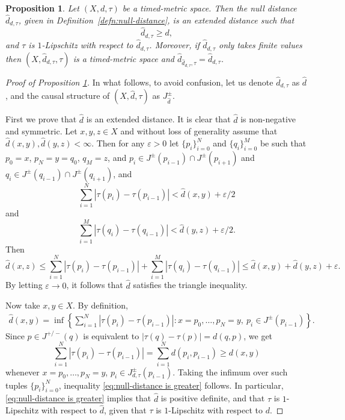 \documentclass[10pt,a4paper]{amsart}
\newtheorem{prop}{Proposition}
\newcommand{\be}{\begin{equation}}
\newcommand{\ee}{\end{equation}}
\begin{document}
\begin{prop}\label{prop-null-distance is greater}
Let $(X,d,\tau)$ be a timed-metric space. 
Then the null distance $\hat{d}_{d,\tau}$, given in Definition~\ref{defn:null-distance}, is an extended distance such that
\begin{equation}\label{eq:null-distance is greater}
\hat{d}_{d,\tau}\geq d,
\end{equation}
and $\tau$ is $1$-Lipschitz with respect to $\hat{d}_{d,\tau}$.
Moreover, if $\hat{d}_{d,\tau}$ only takes finite values then $(X,\hat{d}_{d,\tau},\tau)$ is a timed-metric space and $\hat{d}_{\hat{d}_{d,\tau},\tau} = \hat{d}_{d,\tau}$.
\end{prop}

\begin{proof}[Proof of Proposition \ref{prop-null-distance is greater}]

In what follows, to avoid confusion, let us denote  $\hat{d}_{d,\tau}$ as $\hat{d}$, and the causal structure of $(X,\hat d,\tau)$ as $J^\pm_{\hat d}$. 

First we prove that $\hat{d}$ is an extended distance. It is clear that $\hat{d}$ is non-negative and symmetric. Let $x,y,z\in X$ and without loss of generality assume that 
$\hat{d}(x,y), \hat{d}(y,z)< \infty$.
Then for any $\varepsilon>0$ let $\{p_i\}_{i=0}^{N}$ and $\{q_i\}_{i=0}^{M}$ be such that $p_0=x$, $p_N = y = q_0$, $q_M=z$, and $p_i\in J^\pm(p_{i-1})\cap J^\pm(p_{i+1})$ and $q_i\in J^\pm(q_{i-1})\cap J^\pm(q_{i+1})$, and 
\be
\sum_{i=1}^{N} |\tau(p_i)-\tau(p_{i-1})| < \hat{d}(x,y) + \varepsilon/2 
\ee
and
\be
\sum_{i=1}^{M} |\tau(q_i)-\tau(q_{i-1})| < \hat{d}(y,z) + \varepsilon/2.
\ee
Then
\be
\hat{d}(x,z) \leq \sum_{i=1}^{N} |\tau(p_i)-\tau(p_{i-1})| +  \sum_{i=1}^{M} |\tau(q_i)-\tau(q_{i-1})| \leq \hat{d}(x,y) + \hat{d}(y,z) + \varepsilon.
\ee
By letting $\varepsilon\to 0$, it follows that $\hat d$ satisfies the triangle inequality. 


Now take $x,y \in X$. By definition,
\begin{align*}
\hat{d}(x,y) = \inf\left\{\sum_{i=1}^{N} |\tau(p_i)-\tau(p_{i-1})|: x = p_0,\dots, p_{N} = y,\ p_{i}\in J^{\pm}(p_{i-1})\right\}.
\end{align*}
Since $p\in J^{+/-}(q)$ is equivalent to $|\tau(q)-\tau(p)| = d(q,p)$, we get
\be
\sum_{i=1}^{N} |\tau(p_i)-\tau(p_{i-1})| = \sum_{i=1}^{N} d(p_i,p_{i-1}) \geq d(x,y)
\ee
whenever $x = p_0,\dots, p_{N} = y$, $p_{i}\in J^\pm_{d,\tau}(p_{i-1})$. Taking the infimum over such tuples $\{p_i\}_{i=0}^{N}$, inequality \eqref{eq:null-distance is greater} follows. In particular, \eqref{eq:null-distance is greater} implies that $\hat{d}$ is positive definite, and 
that $\tau$ is $1$-Lipschitz with respect to $\hat{d}$, given that $\tau$ is $1$-Lipschitz with respect to $d$.





\end{proof}
\end{document}
